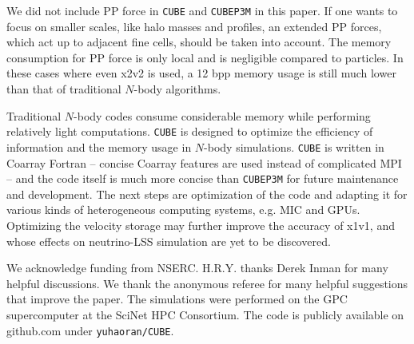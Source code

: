 \documentclass[10pt,twocolumn,reprint]{emulateapj}
\begin{document}
We did not include PP force in {\tt CUBE} and {\tt CUBEP3M} in this paper. If one wants to focus on smaller scales, like halo masses and profiles, an extended PP forces, which act up to adjacent fine cells, should be taken into account. The memory consumption for PP force is only local and is negligible compared to particles. In these cases where even x2v2 is used, a 12 bpp memory usage is still much lower than that of traditional $N$-body algorithms.

Traditional $N$-body codes consume considerable memory while performing relatively light computations. {\tt CUBE} is designed to optimize the efficiency of information and the memory usage in $N$-body simulations. {\tt CUBE} is written in Coarray Fortran -- concise Coarray features are used instead of complicated MPI -- and the code itself is much more concise than {\tt CUBEP3M} for future maintenance and development. The next steps are optimization of the code and adapting it for various kinds of heterogeneous computing systems, e.g. MIC and GPUs. Optimizing the velocity storage may further improve the accuracy of x1v1, and whose effects on neutrino-LSS simulation are yet to be discovered.

\acknowledgements
We acknowledge funding from NSERC.
H.R.Y. thanks Derek Inman for many helpful discussions. We thank the anonymous referee for many helpful suggestions that improve the paper.
The simulations were performed on the GPC supercomputer at the SciNet HPC Consortium.
The code is publicly available on github.com under {\tt yuhaoran/CUBE}.



\end{document}
